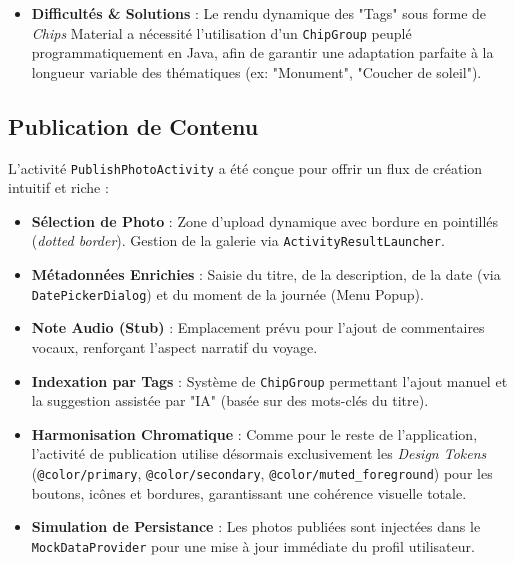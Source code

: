 \documentclass{article}
\begin{document}
\begin{itemize}
\begin{itemize}
        \item \textbf{Engagement} : Système de \textit{toggles} interactifs pour le "Like" et le "Bookmark" avec retour visuel immédiat (changement de couleur et d'icône Lucide).
        \item \textbf{Passerelle TravelPath} : Un bouton "Créer un parcours" permet de basculer vers le module de planification en injectant automatiquement la localisation de la photo comme point d'intérêt.
        \item \textbf{Gestion de l'Encoche} : Utilisation de \texttt{ViewCompat.setOnApplyWindowInsetsListener} pour appliquer dynamiquement un \textit{padding} supérieur, évitant que la barre de titre ne soit masquée par la caméra frontale.
    \end{itemize}
    \item \textbf{Difficultés \& Solutions} : Le rendu dynamique des "Tags" sous forme de \textit{Chips} Material a nécessité l'utilisation d'un \texttt{ChipGroup} peuplé programmatiquement en Java, afin de garantir une adaptation parfaite à la longueur variable des thématiques (ex: "Monument", "Coucher de soleil"). 
\end{itemize}

\subsection{Publication de Contenu}
L'activité \texttt{PublishPhotoActivity} a été conçue pour offrir un flux de création intuitif et riche :
\begin{itemize}
    \item \textbf{Sélection de Photo} : Zone d'upload dynamique avec bordure en pointillés (\textit{dotted border}). Gestion de la galerie via \texttt{ActivityResultLauncher}.
    \item \textbf{Métadonnées Enrichies} : Saisie du titre, de la description, de la date (via \texttt{DatePickerDialog}) et du moment de la journée (Menu Popup).
    \item \textbf{Note Audio (Stub)} : Emplacement prévu pour l'ajout de commentaires vocaux, renforçant l'aspect narratif du voyage.
    \item \textbf{Indexation par Tags} : Système de \texttt{ChipGroup} permettant l'ajout manuel et la suggestion assistée par "IA" (basée sur des mots-clés du titre).
    \item \textbf{Harmonisation Chromatique} : Comme pour le reste de l'application, l'activité de publication utilise désormais exclusivement les \textit{Design Tokens} (\texttt{@color/primary}, \texttt{@color/secondary}, \texttt{@color/muted\_foreground}) pour les boutons, icônes et bordures, garantissant une cohérence visuelle totale.
    \item \textbf{Simulation de Persistance} : Les photos publiées sont injectées dans le \texttt{MockDataProvider} pour une mise à jour immédiate du profil utilisateur.
\end{itemize}
\end{document}
